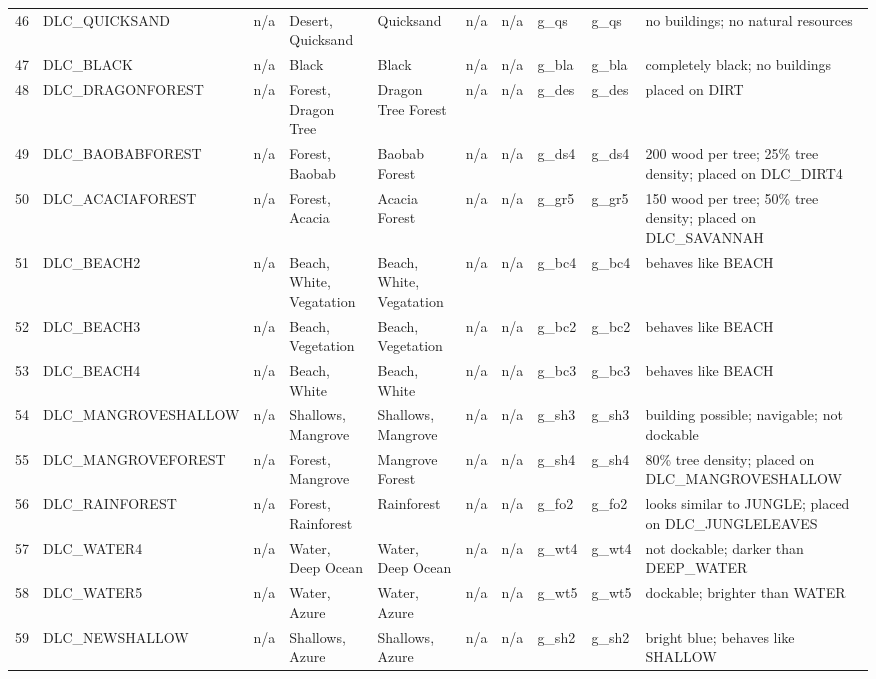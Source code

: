 \begin{appendices}
\begin{landscape}
\begin{longtable}{@{}p{5mm}|p{25mm}p{23mm}|p{14mm}p{14mm}p{14mm}p{14mm}|p{10mm}p{15mm}|p{45mm}@{}}
            46	& DLC\_QUICKSAND	& n/a	& Desert, Quicksand	& Quicksand	& n/a	& n/a	& g\_qs	& g\_qs		& no buildings; no natural resources \\
            47	& DLC\_BLACK	& n/a	& Black	& Black	& n/a	& n/a	& g\_bla	& g\_bla		& completely black; no buildings \\
            48	& DLC\_DRAGONFOREST	& n/a	& Forest, Dragon Tree	& Dragon Tree Forest	& n/a	& n/a	& g\_des	& g\_des		& placed on DIRT \\
            49	& DLC\_BAOBABFOREST	& n/a	& Forest, Baobab	& Baobab Forest	& n/a	& n/a	& g\_ds4	& g\_ds4		& 200 wood per tree; 25\% tree density; placed on DLC\_DIRT4 \\
            50	& DLC\_ACACIAFOREST	& n/a	& Forest, Acacia	& Acacia Forest	& n/a	& n/a	& g\_gr5	& g\_gr5		& 150 wood per tree; 50\% tree density; placed on DLC\_SAVANNAH \\
            51	& DLC\_BEACH2	& n/a	& Beach, White, Vegatation	& Beach, White, Vegatation	& n/a	& n/a	& g\_bc4	& g\_bc4		& behaves like BEACH \\
            52	& DLC\_BEACH3	& n/a	& Beach, Vegetation	& Beach, Vegetation	& n/a	& n/a	& g\_bc2	& g\_bc2		& behaves like BEACH \\
            53	& DLC\_BEACH4	& n/a	& Beach, White	& Beach, White	& n/a	& n/a	& g\_bc3	& g\_bc3		& behaves like BEACH \\
            54	& DLC\_MANGROVESHALLOW	& n/a	& Shallows, Mangrove	& Shallows, Mangrove	& n/a	& n/a	& g\_sh3	& g\_sh3		& building possible; navigable; not dockable \\
            55	& DLC\_MANGROVEFOREST	& n/a	& Forest, Mangrove	& Mangrove Forest	& n/a	& n/a	& g\_sh4	& g\_sh4		& 80\% tree density; placed on DLC\_MANGROVESHALLOW \\
            56	& DLC\_RAINFOREST	& n/a	& Forest, Rainforest	& Rainforest	& n/a	& n/a	& g\_fo2	& g\_fo2		& looks similar to JUNGLE; placed on DLC\_JUNGLELEAVES \\
            57	& DLC\_WATER4	& n/a	& Water, Deep Ocean	& Water, Deep Ocean	& n/a	& n/a	& g\_wt4	& g\_wt4		& not dockable; darker than DEEP\_WATER \\
            58	& DLC\_WATER5	& n/a	& Water, Azure	& Water, Azure	& n/a	& n/a	& g\_wt5	& g\_wt5		& dockable; brighter than WATER \\
            59	& DLC\_NEWSHALLOW	& n/a	& Shallows, Azure	& Shallows, Azure	& n/a	& n/a	& g\_sh2	& g\_sh2		& bright blue; behaves like SHALLOW \\

\end{longtable}
\end{landscape}
\end{appendices}
